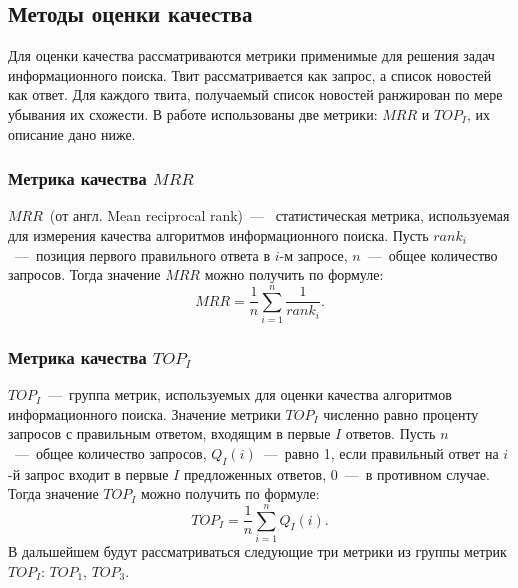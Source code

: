 \subsection{Методы оценки качества}
    Для оценки качества рассматриваются метрики применимые для решения задач информационного поиска.
    Твит рассматривается как запрос, а список новостей как ответ. 
    Для каждого твита, получаемый список новостей ранжирован по мере убывания их схожести.
    В работе использованы две метрики: $MRR$ и $TOP_I$, их описание дано ниже.

    \subsubsection{Метрика качества $MRR$}
    \label{subsubsec:MRR}
        $MRR$~(от англ. Mean reciprocal rank)~---~ статистическая метрика, используемая для измерения качества алгоритмов информационного поиска.
        Пусть $rank_i$~---~позиция первого правильного ответа в $i$-м запросе, $n$~---~общее количество запросов.
        Тогда значение $MRR$ можно получить по формуле:
        $$MRR = \dfrac{1}{n} \sum_{i=1}^n \dfrac{1}{rank_i}.$$

    \subsubsection{Метрика качества $TOP_I$}
        $TOP_I$~---~группа метрик, используемых для оценки качества алгоритмов информационного поиска. Значение метрики $TOP_I$
        численно равно проценту запросов с правильным ответом, входящим в первые $I$ ответов.
        Пусть $n$~---~общее количество запросов, $Q_I(i)$~---~равно 1, если правильный ответ на $i$-й запрос входит в первые $I$ предложенных ответов, 0~---~в противном случае.
        Тогда значение $TOP_I$ можно получить по формуле:
        $$TOP_I=\dfrac{1} {n} \sum_{i=1}^n Q_I(i).$$
        В дальшейшем будут рассматриваться следующие три метрики из группы метрик $TOP_I$: $TOP_1$, $TOP_3$.


%
%
